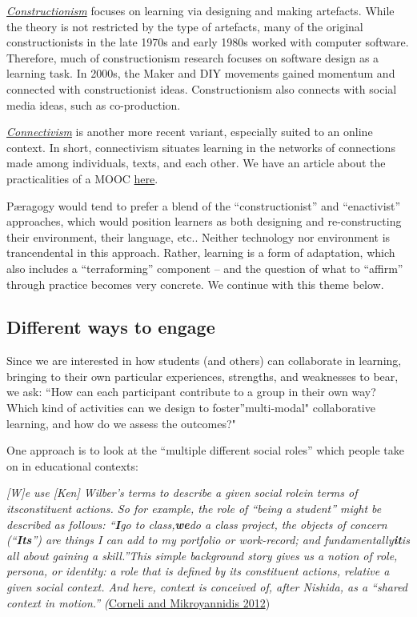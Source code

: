 \href{http://en.wikipedia.org/wiki/Constructionism\_\%28learning\_theory\%29}{\emph{Constructionism}}
focuses on learning via designing and making artefacts. While the theory
is not restricted by the type of artefacts, many of the original
constructionists in the late 1970s and early 1980s worked with computer
software. Therefore, much of constructionism research focuses on
software design as a learning task. In 2000s, the Maker and DIY
movements gained momentum and connected with constructionist ideas.
Constructionism also connects with social media ideas, such as
co-production.

\href{http://en.wikipedia.org/wiki/Connectivism}{\emph{Connectivism}} is
another more recent variant, especially suited to an online context. In
short, connectivism situates learning in the networks of connections
made among individuals, texts, and each other. We have an article about
the practicalities of a MOOC
\href{\%20http://peeragogy.org/connectivism-in-practice-how-to-organize-a-mooc/}{here}.

Pæragogy would tend to prefer a blend of the ``constructionist'' and
``enactivist'' approaches, which would position learners as both
designing and re-constructing their environment, their language, etc..
Neither technology nor environment is trancendental in this approach.
Rather, learning is a form of adaptation, which also includes a
``terraforming'' component -- and the question of what to ``affirm''
through practice becomes very concrete. We continue with this theme
below.

\subsection{Different ways to engage}

Since we are interested in how students (and others) can collaborate in
learning, bringing to their own particular experiences, strengths, and
weaknesses to bear, we ask: ``How can each participant contribute to a
group in their own way? Which kind of activities can we design to
foster''multi-modal" collaborative learning, and how do we assess the
outcomes?"

One approach is to look at the ``multiple different social roles'' which
people take on in educational contexts:

\emph{{[}W{]}e use {[}Ken{]} Wilber's terms to describe a given
\emph{social role}in terms of its\emph{constituent actions}. So for
example, the role of ``being a student'' might be described as follows:
\emph{``}\textbf{\emph{I}}\emph{go to class,}\textbf{\emph{we}}\emph{do
a class project, the objects of concern (``}\textbf{\emph{Its}}\emph{'')
are things I can add to my portfolio or work-record; and
fundamentally}\textbf{\emph{it}}\emph{is all about gaining a
skill.''}This simple background story gives us a notion of role,
persona, or identity: a role that is defined by its constituent actions,
relative a given social context. And here, context is conceived of,
after Nishida, as a ``shared context in motion.''
(}\href{http://oro.open.ac.uk/33221/1/}{Corneli and Mikroyannidis 2012})

